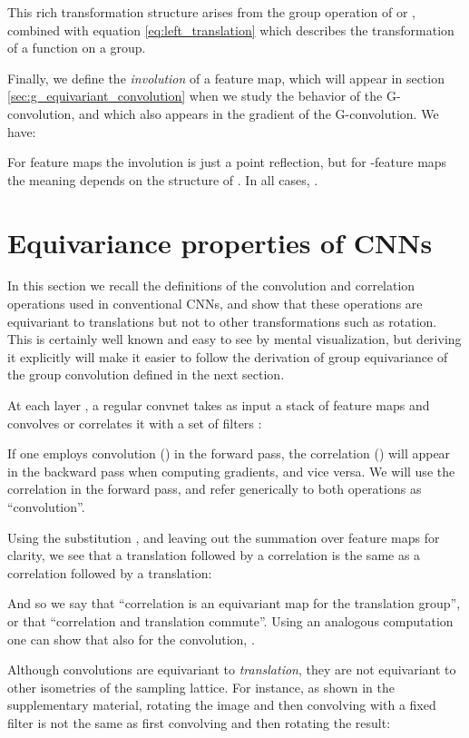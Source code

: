 \documentclass{article}
\begin{document}
This rich transformation structure arises from the group operation of  or , combined with equation \ref{eq:left_translation} which describes the transformation of a function on a group.

Finally, we define the \emph{involution} of a feature map, which will appear in section \ref{sec:g_equivariant_convolution} when we study the behavior of the G-convolution, and which also appears in the gradient of the G-convolution.
We have:

For  feature maps the involution is just a point reflection, but for -feature maps the meaning depends on the structure of .
In all cases, .


\section{Equivariance properties of CNNs}
\label{sec:translation_equivariance_of_CNNs}

In this section we recall the definitions of the convolution and correlation operations used in conventional CNNs, and show that these operations are equivariant to translations but not to other transformations such as rotation.
This is certainly well known and easy to see by mental visualization, but deriving it explicitly will make it easier to follow the derivation of group equivariance of the group convolution defined in the next section. 

At each layer , a regular convnet takes as input a stack of feature maps  and convolves or correlates it with a set of  filters :


If one employs convolution () in the forward pass, the correlation () will appear in the backward pass when computing gradients, and vice versa.
We will use the correlation in the forward pass, and refer generically to both operations as ``convolution''.

Using the substitution , and leaving out the summation over feature maps for clarity, we see that a translation followed by a correlation is the same as a correlation followed by a translation:

And so we say that ``correlation is an equivariant map for the translation group'', or that ``correlation and translation commute''.
Using an analogous computation one can show that also for the convolution, .

Although convolutions are equivariant to \emph{translation}, they are not equivariant to other isometries of the sampling lattice.
For instance, as shown in the supplementary material, rotating the image and then convolving with a fixed filter is not the same as first convolving and then rotating the result:
\end{document}
